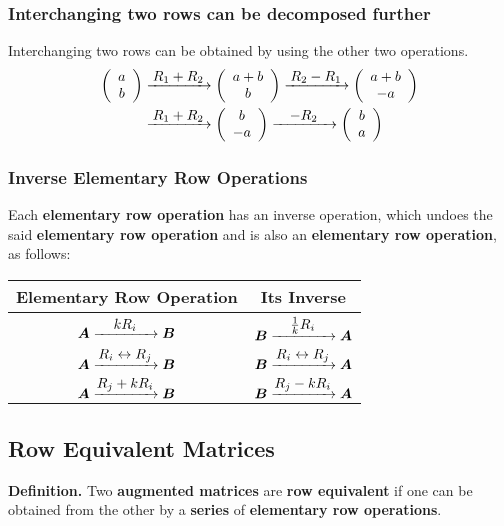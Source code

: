 \documentclass[../ma2001_notes.tex]{subfiles}
\begin{document}
\subsubsection{Interchanging two rows can be decomposed further}
Interchanging two rows can be obtained by using the other two operations.
\begin{align*}
	\left(\begin{array}{c}
	a \\
	b
	\end{array}\right)
	& \ro{$$R_1+R_2$$}
	\left(\begin{array}{c}
	a+b \\
	b
	\end{array}\right)
	\ro{$$R_2-R_1$$}
	\left(\begin{array}{c}
	a+b \\
	-a
	\end{array}\right) \\
	& \ro{$$R_1+R_2$$}
	\left(\begin{array}{c}
	b \\
	-a
	\end{array}\right)
	\ro{$$-R_2$$}
	\left(\begin{array}{c}
	b \\
	a
	\end{array}\right)
\end{align*}

\subsubsection{Inverse Elementary Row Operations}
Each \textbf{elementary row operation} has an inverse operation, which undoes the said \textbf{elementary row operation} and is also an \textbf{elementary row operation}, as follows:
\begin{center}
\begin{tabular}{|c|c|}
\hline
\textbf{Elementary Row Operation} & \textbf{Its Inverse} \\
\hline
\(\bm{A}\ro{$$kR_i$$}\bm{B}\) & \(\bm{B}\ro{$$\frac{1}{k}R_i$$}\bm{A}\) \\
\hline
\(\bm{A}\ro{$$R_i\leftrightarrow R_j$$}\bm{B}\) & \(\bm{B}\ro{$$R_i\leftrightarrow R_j$$}\bm{A}\) \\
\hline
\(\bm{A}\ro{$$R_j+kR_i$$}\bm{B}\) & \(\bm{B}\ro{$$R_j-kR_i$$}\bm{A}\) \\
\hline
\end{tabular}
\end{center}

\subsection{Row Equivalent Matrices}
\textbf{Definition.} Two \textbf{augmented matrices} are \textbf{row equivalent} if one can be obtained from the other by a \textbf{series} of \textbf{elementary row operations}.
\end{document}
